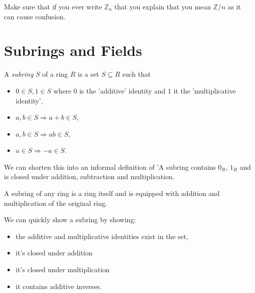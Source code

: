 \begin{remark}
  Make sure that if you ever write $\mathbb{Z}_n$ that you explain that you mean $\mathbb{Z}/n$ as it can cause confusion.
\end{remark}


\section{Subrings and Fields}

\begin{definition}[Subring]
  A \emph{subring} $S$ of a ring $R$ is a set $S \subseteq R$ such that
\begin{itemize}

  \item[i)] $0 \in S, 1 \in S$ where $0$ is the 'additive' identity and $1$ it the 'multiplicative identity',
\item[ii)] $a, b \in S \Rightarrow a+b \in S$,
\item[iii)] $a, b \in S \Rightarrow a b \in S$,
\item[iv)] $a \in S \Rightarrow-a \in S$.
\end{itemize}

\end{definition}

\begin{remark}
  We can shorten this into an informal definition of 'A subring contains $0_R$, $1_R$ and is closed under addition, subtraction and multiplication.
\end{remark}

\begin{remark}
A subring of any ring is a ring itself and is equipped with addition and multiplication of the original ring.  
\end{remark}

\begin{method}
  We can quickly show a subring by showing:

  \begin{itemize}
    \item the additive and multiplicative identities exist in the set,
    \item it's closed under addition
    \item it's closed under multiplication
    \item it contains additive inverses.
  \end{itemize}
  \end{method}

